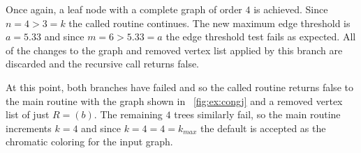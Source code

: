 Once again, a leaf node with a complete graph of order \(4\) is achieved.  Since \(n=4>3=k\) the called routine
continues.  The new maximum edge threshold is \(a=5.33\) and since \(m=6>5.33=a\) the edge threshold test fails as
expected.  All of the changes to the graph and removed vertex list applied by this branch are discarded and the
recursive call returns false.

At this point, both branches have failed and so the called routine returns false to the main routine with the graph
shown in \figurename~\ref{fig:ex:congj} and a removed vertex list of just \(R=(b)\).  The remaining \(4\) trees
similarly fail, so the main routine increments \(k=4\) and since \(k=4=4=k_{max}\) the default  is
accepted as the chromatic coloring for the input graph.
